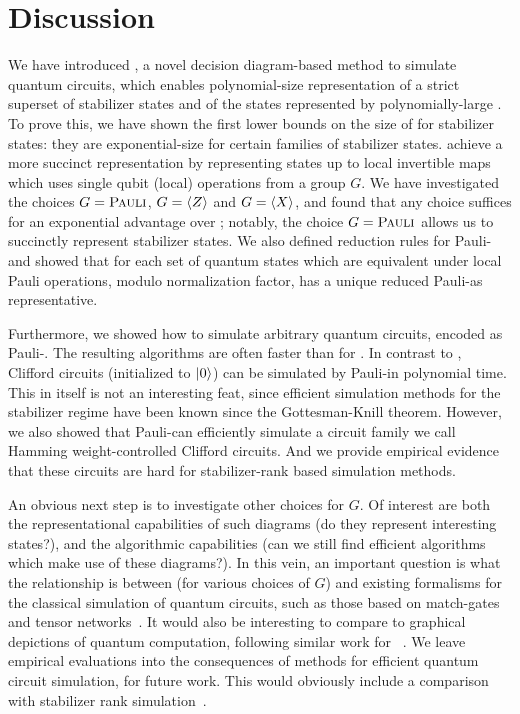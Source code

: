 \section{Discussion \label{sec:discussion}}

We have introduced \limdd, a novel decision diagram-based method to simulate quantum circuits, which enables polynomial-size representation of a strict superset of stabilizer states and of the states represented by polynomially-large \qmdds.
To prove this, we have shown the first lower bounds on the size of \qmdds for stabilizer states:
they are exponential-size for certain families of stabilizer states.
\limdds achieve a more succinct representation by representing states up to 
local invertible maps which uses single qubit (local) operations from a group $G$.
We have investigated the choices $G=\textsc{Pauli}$, $G=\braket{Z}$ and $G=\braket{X}$,
and found that any choice suffices for an exponential advantage over \qmdds;
notably, the choice $G=\textsc{Pauli}$ allows us to succinctly represent stabilizer states.
We also defined reduction rules for Pauli-\limdd and showed that for each set of 
quantum states which are equivalent under local Pauli operations,
modulo normalization factor, has a unique reduced Pauli-\limdd as representative.

Furthermore, we showed how to simulate arbitrary quantum circuits, encoded as Pauli-\limdds.
The resulting algorithms are often faster than for \qmdds.
In contrast to \qmdds, Clifford circuits (initialized to $\ket{0}$)
can be simulated by Pauli-\limdds in polynomial time.
This in itself is not an interesting feat, since efficient simulation methods for
the stabilizer regime have been known since the Gottesman-Knill theorem.
However, we also showed that Pauli-\limdds can efficiently simulate
a circuit family we call Hamming weight-controlled Clifford circuits.
And we provide empirical evidence that these circuits are hard for stabilizer-rank
based simulation methods.

An obvious next step is to investigate other choices for $G$.
Of interest are both the representational capabilities of such diagrams
(do they represent interesting states?), and the algorithmic capabilities
(can we still find efficient algorithms which make use of these diagrams?).
In this vein, an important question is what the relationship is between \glimdds
(for various choices of $G$) and existing formalisms for the classical simulation of quantum circuits, such as those based on match-gates~\cite{terhal2001classical,jozsa2008matchgates,hebenstreit2020computational} and tensor networks~\cite{orus2014practical}.
It would also be interesting to compare \limdds to graphical depictions of quantum computation, 
following similar work for \qmdds~\cite{vilmart2021quantum}.
We leave empirical evaluations into the consequences of \limdd methods for efficient
quantum circuit simulation, for future work. This would obviously include a 
comparison with stabilizer rank simulation~\cite{bravyi2019simulation}.

